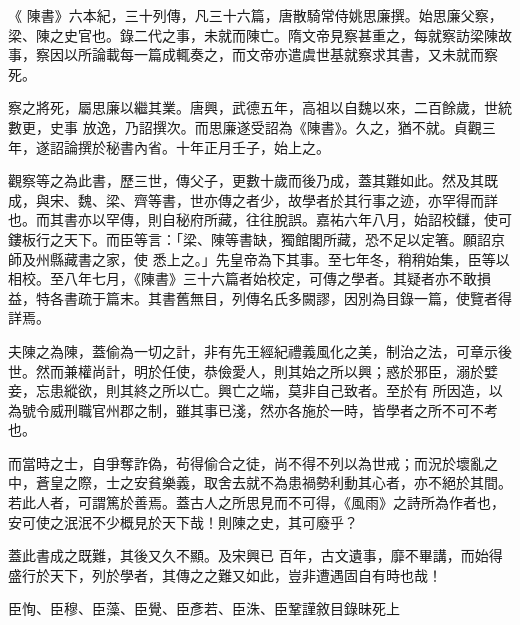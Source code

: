 
\begin{pinyinscope}

 《
 陳書》六本紀，三十列傳，凡三十六篇，唐散騎常侍姚思廉撰。始思廉父察，梁、陳之史官也。錄二代之事，未就而陳亡。隋文帝見察甚重之，每就察訪梁陳故事，察因以所論載每一篇成輒奏之，而文帝亦遣虞世基就察求其書，又未就而察死。



 察之將死，屬思廉以繼其業。唐興，武德五年，高祖以自魏以來，二百餘歲，世統數更，史事
 放逸，乃詔撰次。而思廉遂受詔為《陳書》。久之，猶不就。貞觀三年，遂詔論撰於秘書內省。十年正月壬子，始上之。



 觀察等之為此書，歷三世，傳父子，更數十歲而後乃成，蓋其難如此。然及其既成，與宋、魏、梁、齊等書，世亦傳之者少，故學者於其行事之迹，亦罕得而詳也。而其書亦以罕傳，則自秘府所藏，往往脫誤。嘉祐六年八月，始詔校讎，使可鏤板行之天下。而臣等言：「梁、陳等書缺，獨館閣所藏，恐不足以定箸。願詔京師及州縣藏書之家，使
 悉上之。」先皇帝為下其事。至七年冬，稍稍始集，臣等以相校。至八年七月，《陳書》三十六篇者始校定，可傳之學者。其疑者亦不敢損益，特各書疏于篇末。其書舊無目，列傳名氏多闕謬，因別為目錄一篇，使覽者得詳焉。



 夫陳之為陳，蓋偷為一切之計，非有先王經紀禮義風化之美，制治之法，可章示後世。然而兼權尚計，明於任使，恭儉愛人，則其始之所以興；惑於邪臣，溺於嬖妾，忘患縱欲，則其終之所以亡。興亡之端，莫非自己致者。至於有
 所因造，以為號令威刑職官州郡之制，雖其事已淺，然亦各施於一時，皆學者之所不可不考也。



 而當時之士，自爭奪詐偽，茍得偷合之徒，尚不得不列以為世戒；而況於壞亂之中，蒼皇之際，士之安貧樂義，取舍去就不為患禍勢利動其心者，亦不絕於其間。若此人者，可謂篤於善焉。蓋古人之所思見而不可得，《風雨》之詩所為作者也，安可使之泯泯不少概見於天下哉！則陳之史，其可廢乎？



 蓋此書成之既難，其後又久不顯。及宋興已
 百年，古文遺事，靡不畢講，而始得盛行於天下，列於學者，其傳之之難又如此，豈非遭遇固自有時也哉！



 臣恂、臣穆、臣藻、臣覺、臣彥若、臣洙、臣鞏謹敘目錄昧死上



\end{pinyinscope}